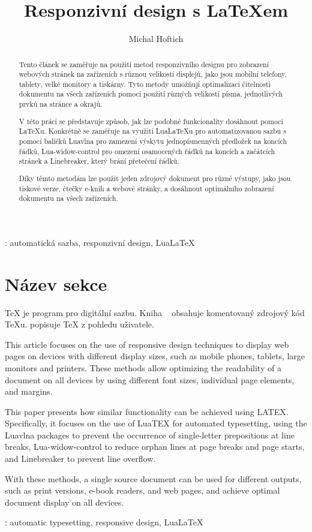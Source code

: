 \documentclass{csbulletin}
\begin{document}
\title{Responzivní design s \LaTeX em}
\author{Michal Hoftich}
\maketitle

\begin{abstract}
Tento článek se zaměřuje na použití metod responzivního designu pro zobrazení
webových stránek na zařízeních s různou velikostí displejů, jako jsou mobilní
telefony, tablety, velké monitory a tiskárny. Tyto metody umožňují optimalizaci
čitelnosti dokumentu na všech zařízeních pomocí použití různých velikostí
písma, jednotlivých prvků na stránce a okrajů.

V této práci se představuje způsob, jak lze podobné funkcionality dosáhnout
pomocí \LaTeX u. Konkrétně se zaměřuje na využití Lua\LaTeX u pro automatizovanou
sazbu s pomocí balíčků Luavlna pro zamezení výskytu jednopísmenných předložek
na koncích řádků, Lua-widow-control pro omezení osamocených řádků na koncích a
začátcích stránek a Linebreaker, který brání přetečení řádků.

Díky těmto metodám lze použít jeden zdrojový dokument pro různé výstupy, jako
jsou tiskové verze, čtečky e-knih a webové stránky, a dosáhnout optimálního
zobrazení dokumentu na všech zařízeních.
\end{abstract}
\klicovaslova: automatická sazba, responzivní design, Lua\LaTeX


\section{Název sekce}
\TeX{} je program pro digitální sazbu. Kniha ~\cite{knuth-ttp} obsahuje komentovaný zdrojový kód \TeX u. \textcite{knuth-tb} popisuje \TeX{} z pohledu uživatele.

\printbibliography

\begin{summary}
  This article focuses on the use of responsive design techniques to display web pages on devices with different display sizes, such as mobile phones, tablets, large monitors and printers. These methods allow optimizing the readability of a document on all devices by using different font sizes, individual page elements, and margins.

  This paper presents how similar functionality can be achieved using LATEX. Specifically, it focuses on the use of LuaTEX for automated typesetting, using the Luavlna packages to prevent the occurrence of single-letter prepositions at line breaks, Lua-widow-control to reduce orphan lines at page breaks and page starts, and Linebreaker to prevent line overflow.

  With these methods, a single source document can be used for different outputs, such as print versions, e-book readers, and web pages, and achieve optimal document display on all devices.

\keywords: automatic typesetting, responsive design, Lua\LaTeX
\end{summary}
\end{document}
